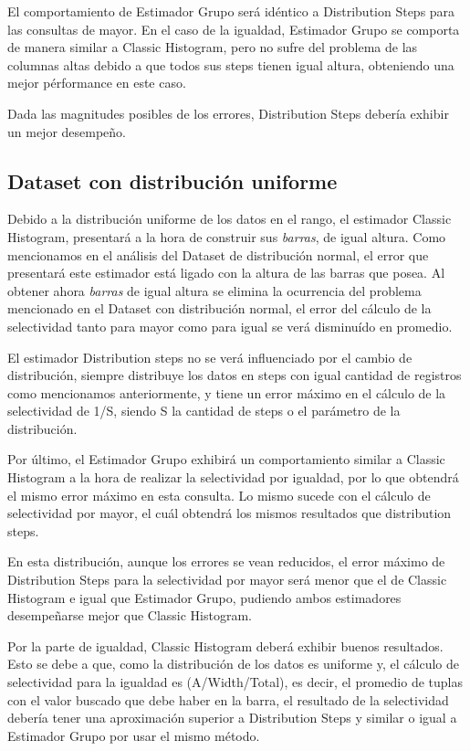 \documentclass[a4paper, 10pt, twoside]{article}
\begin{document}
El comportamiento de Estimador Grupo será idéntico a Distribution Steps para las consultas de mayor. En el caso de la igualdad, Estimador Grupo se comporta de manera similar a Classic Histogram, pero no sufre del problema de las columnas altas debido a que todos sus steps tienen igual altura, obteniendo una mejor pérformance en este caso.

Dada las magnitudes posibles de los errores, Distribution Steps debería exhibir un mejor desempeño.

\subsection{Dataset con distribución uniforme}

Debido a la distribución uniforme de los datos en el rango, el estimador Classic Histogram, presentará a la hora de construir sus \textit{barras}, de igual altura. Como mencionamos en el análisis del Dataset de distribución normal, el error que presentará este estimador está ligado con la altura de las barras que posea. Al obtener ahora \textit{barras} de igual altura se elimina la ocurrencia del problema mencionado en el Dataset con distribución normal, el error del cálculo de la selectividad tanto para mayor como para igual se verá disminuído en promedio. 

El estimador Distribution steps no se verá influenciado por el cambio de distribución, siempre distribuye los datos en steps con igual cantidad de registros como mencionamos anteriormente, y tiene un error máximo en el cálculo de la selectividad de 1/S, siendo S la cantidad de steps o el parámetro de la distribución.

Por último, el Estimador Grupo exhibirá un comportamiento similar a Classic Histogram a la hora de realizar la selectividad por igualdad, por lo que obtendrá el mismo error máximo en esta consulta. Lo mismo sucede con el cálculo de selectividad por mayor, el cuál obtendrá los mismos resultados que distribution steps.

En esta distribución, aunque los errores se vean reducidos, el error máximo de Distribution Steps para la selectividad por mayor será menor que el de Classic Histogram e igual que Estimador Grupo, pudiendo ambos estimadores desempeñarse mejor que Classic Histogram.

Por la parte de igualdad, Classic Histogram deberá exhibir buenos resultados. Esto se debe a que, como la distribución de los datos es uniforme y, el cálculo de selectividad para la igualdad es (A/Width/Total), es decir, el promedio de tuplas con el valor buscado que debe haber en la barra, el resultado de la selectividad debería tener una aproximación superior a Distribution Steps y similar o igual a Estimador Grupo por usar el mismo método.
\end{document}
